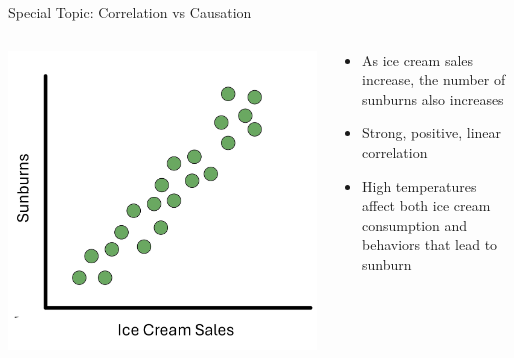 \documentclass[
  ignorenonframetext,
]{beamer}
\begin{document}
\begin{frame}{Special Topic: Correlation vs Causation}
\label{special-topic-correlation-vs-causation-1}
\begin{columns}[T]
\begin{column}{0.48\textwidth}
\begin{center}
\includegraphics{class31_files/mediabag/ice-cream-sales.png}
\end{center}
\end{column}

\begin{column}{0.48\textwidth}
\begin{itemize}
\item
  As ice cream sales increase, the number of sunburns also increases
\item
  Strong, positive, linear correlation
\item
  High temperatures affect both ice cream consumption and behaviors that
  lead to sunburn
\end{itemize}
\end{column}
\end{columns}
\end{frame}
\end{document}
